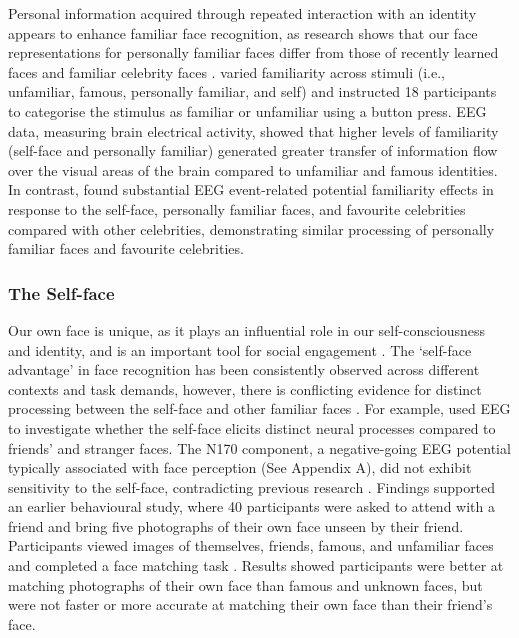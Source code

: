 \documentclass[
  10pt,
  letterpaper,
]{article}
\begin{document}
Personal information acquired through repeated interaction with an
identity appears to enhance familiar face recognition, as research shows
that our face representations for personally familiar faces differ from
those of recently learned faces and familiar celebrity faces
\citep{cloutier2011a, ramon2017a, rooney2012a}.
\citet{karimi-rouzbahani2021a} varied familiarity across stimuli (i.e.,
unfamiliar, famous, personally familiar, and self) and instructed 18
participants to categorise the stimulus as familiar or unfamiliar using
a button press. EEG data, measuring brain electrical activity, showed
that higher levels of familiarity (self-face and personally familiar)
generated greater transfer of information flow over the visual areas of
the brain compared to unfamiliar and famous identities. In contrast,
\citet{wiese2021a} found substantial EEG event-related potential
familiarity effects in response to the self-face, personally familiar
faces, and favourite celebrities compared with other celebrities,
demonstrating similar processing of personally familiar faces and
favourite celebrities.

\subsubsection{The Self-face}\label{the-self-face}

Our own face is unique, as it plays an influential role in our
self-consciousness and identity, and is an important tool for social
engagement \citep{bortolon2018a}. The `self-face advantage' in face
recognition has been consistently observed across different contexts and
task demands, however, there is conflicting evidence for distinct
processing between the self-face and other familiar faces
\citep{alzueta2019a, tong1999a, wiese2019a}. For example,
\citet{alzueta2019a} used EEG to investigate whether the self-face
elicits distinct neural processes compared to friends' and stranger
faces. The N170 component, a negative-going EEG potential typically
associated with face perception (See Appendix A), did not exhibit
sensitivity to the self-face, contradicting previous research
\citep{caharel2021a, wiese2019a}. Findings supported an earlier
behavioural study, where 40 participants were asked to attend with a
friend and bring five photographs of their own face unseen by their
friend. Participants viewed images of themselves, friends, famous, and
unfamiliar faces and completed a face matching task
\citep{bortolon2017a}. Results showed participants were better at
matching photographs of their own face than famous and unknown faces,
but were not faster or more accurate at matching their own face than
their friend's face.
\end{document}
